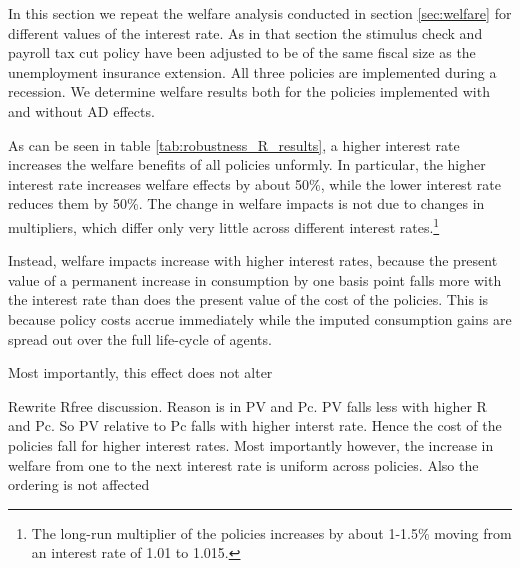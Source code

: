 \documentclass[../HAFiscal]{subfiles}
\begin{document}
In this section we repeat the welfare analysis conducted in section \ref{sec:welfare} for different values of the interest rate. As in that section the stimulus check and payroll tax cut policy have been adjusted to be of the same fiscal size as the unemployment insurance extension. All three policies are implemented during a recession. We determine welfare results both for the policies implemented with and without AD effects.

As can be seen in table \ref{tab:robustness_R_results}, a higher interest rate increases the welfare benefits of all policies unformly. In particular, the higher interest rate increases welfare effects by about 50\%, while the lower interest rate reduces them by 50\%. The change in welfare impacts is not due to changes in multipliers, which differ only very little across different interest rates.\footnote{The long-run multiplier of the policies increases by about 1-1.5\% moving from an interest rate of 1.01 to 1.015.} 

Instead, welfare impacts increase with higher interest rates, because the present value of a permanent increase in consumption by one basis point falls more with the interest rate than does the present value of the cost of the policies. This is because policy costs accrue immediately while the imputed consumption gains are spread out over the full life-cycle of agents. 

Most importantly, this effect does not alter


Rewrite Rfree discussion. Reason is in PV and Pc. PV falls less with higher R and Pc. So PV relative to Pc falls with higher interst rate. Hence the cost of the policies fall for higher interest rates. Most importantly however, the increase in welfare from one to the next interest rate is uniform across policies. Also the ordering is not affected
\end{document}
